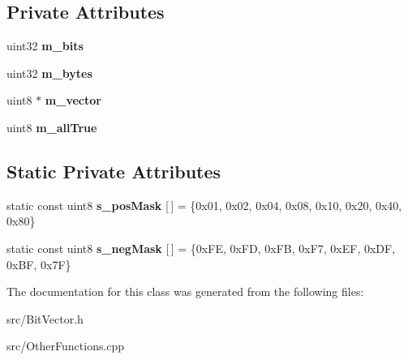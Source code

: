 \subsection*{Private Attributes}
\begin{DoxyCompactItemize}
\item 
uint32 {\bfseries m\_\-bits}\label{classBitVector_a65bbd236ee4f2a5d6dde4ff505b47720}

\item 
uint32 {\bfseries m\_\-bytes}\label{classBitVector_ad33f30bede3b7ab233c0d6e5dcb48117}

\item 
uint8 $\ast$ {\bfseries m\_\-vector}\label{classBitVector_afe9a841f608cc2a73d471d4336c20a1b}

\item 
uint8 {\bfseries m\_\-allTrue}\label{classBitVector_a8e32713ff59bd1afa2aa369a0c38ed02}

\end{DoxyCompactItemize}
\subsection*{Static Private Attributes}
\begin{DoxyCompactItemize}
\item 
static const uint8 {\bfseries s\_\-posMask} [$\,$] = \{0x01, 0x02, 0x04, 0x08, 0x10, 0x20, 0x40, 0x80\}\label{classBitVector_ac8aac3534c8101b640e0e22fa2479e81}

\item 
static const uint8 {\bfseries s\_\-negMask} [$\,$] = \{0xFE, 0xFD, 0xFB, 0xF7, 0xEF, 0xDF, 0xBF, 0x7F\}\label{classBitVector_a0304da147962fc33dbe72573bab804f1}

\end{DoxyCompactItemize}


The documentation for this class was generated from the following files:\begin{DoxyCompactItemize}
\item 
src/BitVector.h\item 
src/OtherFunctions.cpp\end{DoxyCompactItemize}
